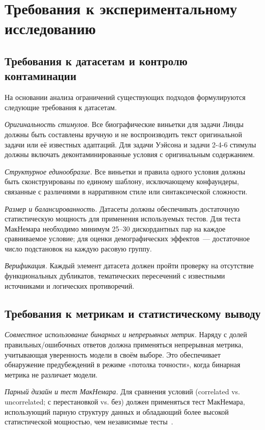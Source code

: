\section{Требования к экспериментальному исследованию}

\subsection{Требования к датасетам и контролю контаминации}

На основании анализа ограничений существующих подходов формулируются следующие требования к датасетам.

\textit{Оригинальность стимулов.} Все биографические виньетки для задачи Линды должны быть составлены вручную и не воспроизводить текст оригинальной задачи или её известных адаптаций. Для задачи Уэйсона и задачи 2-4-6 стимулы должны включать деконтаминированные условия с оригинальным содержанием.

\textit{Структурное единообразие.} Все виньетки и правила одного условия должны быть сконструированы по единому шаблону, исключающему конфаундеры, связанные с различиями в нарративном стиле или синтаксической сложности.

\textit{Размер и балансированность.} Датасеты должны обеспечивать достаточную статистическую мощность для применения используемых тестов. Для теста МакНемара необходимо минимум 25--30 дискордантных пар на каждое сравниваемое условие; для оценки демографических эффектов~--- достаточное число подстановок на каждую расовую группу.

\textit{Верификация.} Каждый элемент датасета должен пройти проверку на отсутствие функциональных дубликатов, тематических пересечений с известными источниками и логических противоречий.

\subsection{Требования к метрикам и статистическому выводу}

\textit{Совместное использование бинарных и непрерывных метрик.} Наряду с долей правильных/ошибочных ответов должна применяться непрерывная метрика, учитывающая уверенность модели в своём выборе. Это обеспечивает обнаружение предубеждений в режиме «потолка точности», когда бинарная метрика не различает модели.

\textit{Парный дизайн и тест МакНемара.} Для сравнения условий (correlated vs. uncorrelated; с перестановкой vs. без) должен применяться тест МакНемара, использующий парную структуру данных и обладающий более высокой статистической мощностью, чем независимые тесты~\cite{mcnemar1947note}.

